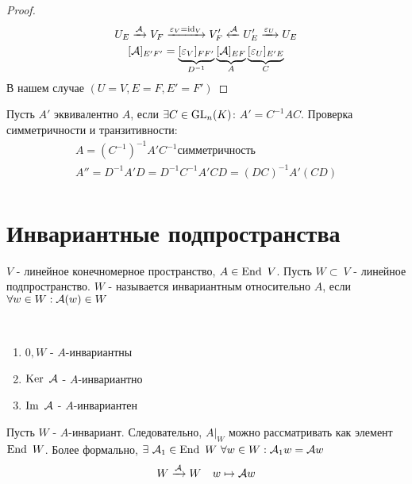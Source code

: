 \documentclass[main]{subfiles}
\begin{document}
\begin{proof}
    \begin{gather*} %
        U_E \xrightarrow{\mca} V_F \xrightarrow{\epsilon_V=\id_V} V_F' \xleftarrow{\mca} U_E'\xrightarrow{\epsilon_U} U_E \\
        [\mca]_{E'F'}=\underbrace{[\epsilon_V]_{FF'}}_{D^{-1}}\underbrace{[\mca]_{EF}}_{A}\underbrace{[\epsilon_U]_{E'E}}_{C} \\
    \end{gather*}
    В нашем случае $(U=V, E=F, E'=F')$
\end{proof}

\begin{definition}
    Пусть $A'$ эквивалентно $A$, если $\exists C \in \operatorname{GL}_n(K)$: $A'=C^{-1}AC$. 
    Проверка симметричности и транзитивности:
    \begin{gather*} 
        A= (C^{-1})^{-1}A'C^{-1} симметричность \\
        A'' = D^{-1}A'D=D^{-1}C^{-1}A'CD=(DC)^{-1}A'(CD)  \\
    \end{gather*}
\end{definition}




\chapter{Инвариантные подпространства}

\begin{definition}
   $V$ - линейное конечномерное пространство, $A\in \operatorname{End} \ V$. Пусть $W\subset \ V$ - линейное подпространство. 
   $W$ - называется инвариантным относительно $A$, если $\forall w\in W : \mathcal{A}(w) \in W$
\end{definition}

\begin{propertylist} 
    \
    \begin{enumerate}
        \item $0, W$ - $A$-инвариантны
        \item $\operatorname{Ker} \ \mathcal{A}$ - $A$-инвариантно
        \item $\operatorname{Im} \ \mathcal{A}$ - $A$-инвариантен
    \end{enumerate}
\end{propertylist}
    


Пусть $W$ - $A$-инвариант. Следовательно, $A|_W$ можно рассматривать как элемент $\operatorname{End} \ W$. 
Более формально, $\exists\  \mathcal{A}_1 \in \operatorname{End} \ W \ \forall w \in W : \mathcal{A}_1 w=\mathcal{A} w$
$$W\xrightarrow{\mathcal{A}} W \quad w\mapsto \mathcal{A} w$$
\end{document}
